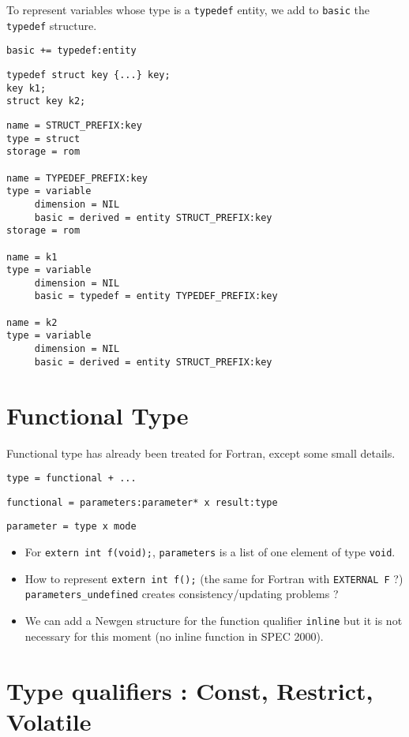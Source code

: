 \documentclass[a4paper]{report}
\begin{document}
To represent variables whose type is a \verb/typedef/ entity, we add to
\verb/basic/ the \verb/typedef/ structure. 

\verb/basic += typedef:entity/ 

\begin{lstlisting}
typedef struct key {...} key;
key k1;
struct key k2; 
\end{lstlisting}  

\begin{verbatim}
name = STRUCT_PREFIX:key
type = struct  
storage = rom 

name = TYPEDEF_PREFIX:key 
type = variable 
     dimension = NIL
     basic = derived = entity STRUCT_PREFIX:key
storage = rom

name = k1
type = variable 
     dimension = NIL
     basic = typedef = entity TYPEDEF_PREFIX:key

name = k2
type = variable 
     dimension = NIL
     basic = derived = entity STRUCT_PREFIX:key
\end{verbatim}

\section{Functional Type}

Functional type has already been treated for Fortran, except some small details.

\verb/type = functional + .../

\verb/functional = parameters:parameter* x result:type/

\verb/parameter = type x mode /

\begin{itemize}
\item For \lstinline/extern int f(void);/, \verb/parameters/ is a list of one element of type
\lstinline/void/.
\item How to represent \lstinline/extern int f();/ (the same for Fortran with
\verb/EXTERNAL F/ ?) \verb/parameters_undefined/ creates
consistency/updating problems ?
\item We can add a Newgen structure for the function qualifier \verb/inline/ but
it is not necessary for this moment (no inline function in SPEC 2000).
\end{itemize}

\section{Type qualifiers : Const, Restrict, Volatile}
\label{type_qualifiers}
\end{document}
